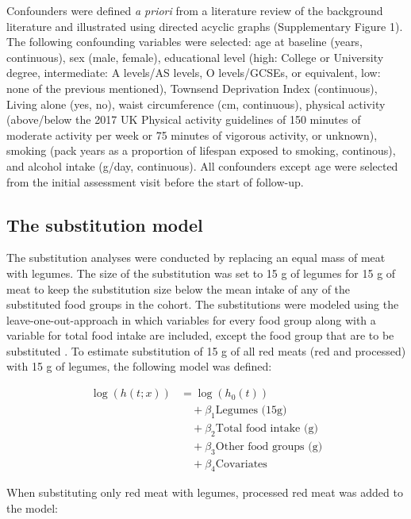 \documentclass[sn-basic,Numbered,iicol,pdflatex]{sn-jnl}
\begin{document}
Confounders were defined \emph{a priori} from a literature review of the
background literature and illustrated using directed acyclic graphs
(Supplementary Figure 1). The following confounding variables were
selected: age at baseline (years, continuous), sex (male, female),
educational level (high: College or University degree, intermediate: A
levels/AS levels, O levels/GCSEs, or equivalent, low: none of the
previous mentioned), Townsend Deprivation Index (continuous), Living
alone (yes, no), waist circumference (cm, continuous), physical activity
(above/below the 2017 UK Physical activity guidelines of 150 minutes of
moderate activity per week or 75 minutes of vigorous activity, or
unknown), smoking (pack years as a proportion of lifespan exposed to
smoking, continous), and alcohol intake (g/day, continuous). All
confounders except age were selected from the initial assessment visit
before the start of follow-up.

\hypertarget{subsec5}{%
\subsection{The substitution model}\label{subsec5}}

The substitution analyses were conducted by replacing an equal mass of
meat with legumes. The size of the substitution was set to 15 g of
legumes for 15 g of meat to keep the substitution size below the mean
intake of any of the substituted food groups in the cohort. The
substitutions were modeled using the leave-one-out-approach in which
variables for every food group along with a variable for total food
intake are included, except the food group that are to be substituted
\citep{Ibsen2021}. To estimate substitution of 15 g of all red meats (red and
processed) with 15 g of legumes, the following model was defined:

\begin{align}
\log(h(t;x)) &= \log(h_0(t)) \nonumber \\
&\quad + \beta_1 \text{Legumes (15g)} \nonumber \\
&\quad + \beta_2 \text{Total food intake (g)} \nonumber \\
&\quad + \beta_3 \text{Other food groups (g)} \nonumber \\
&\quad + \beta_4 \text{Covariates}
\end{align}

\noindent When substituting only red meat with legumes, processed red
meat was added to the model:
\end{document}
